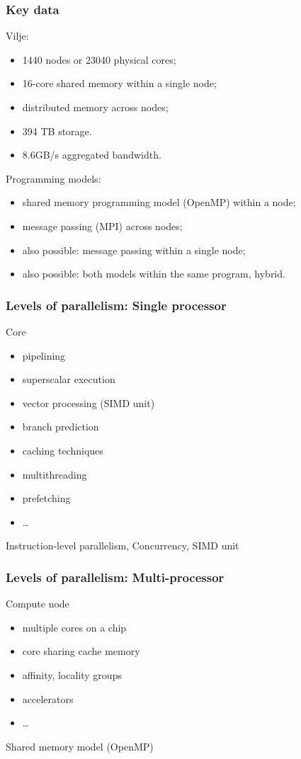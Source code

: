 \begin{frame}
  \frametitle{Key data}

  Vilje:
  \begin{itemize}
  \item 1440 nodes or 23040 physical cores;
  \item 16-core shared memory within a single node;
  \item distributed memory across nodes;
  \item 394 TB storage.
  \item 8.6GB/s aggregated bandwidth.
  \end{itemize}

  Programming models:
  \begin{itemize}
  \item shared memory programming model (OpenMP) within a node;
  \item message passing (MPI) across nodes;
  \item also possible: message passing within a single node;
  \item also possible: both models within the same program, hybrid.
  \end{itemize}
\end{frame}

\begin{frame}
  \frametitle{Levels of parallelism: Single processor}

Core
\begin{itemize}
\item pipelining
\item superscalar execution
\item vector processing (SIMD unit)
\item branch prediction
\item caching techniques
\item multithreading
\item prefetching
\item \dots
\end{itemize}
\begin{center}
Instruction-level parallelism, Concurrency, SIMD unit
\end{center}

\end{frame}

\begin{frame}
  \frametitle{Levels of parallelism: Multi-processor}

Compute node
\begin{itemize}
\item multiple cores on a chip
\item core sharing cache memory
\item affinity, locality groups
\item accelerators
\item \dots
\end{itemize}
\begin{center}
Shared memory model (OpenMP)
\end{center}

\end{frame}

